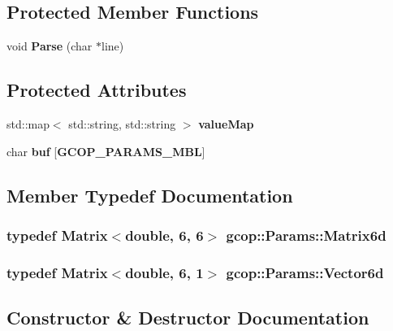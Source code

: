 \subsection*{\-Protected \-Member \-Functions}
\begin{DoxyCompactItemize}
\item 
void {\bf \-Parse} (char $\ast$line)
\end{DoxyCompactItemize}
\subsection*{\-Protected \-Attributes}
\begin{DoxyCompactItemize}
\item 
std\-::map$<$ std\-::string, \*
std\-::string $>$ {\bf value\-Map}
\item 
char {\bf buf} [{\bf \-G\-C\-O\-P\-\_\-\-P\-A\-R\-A\-M\-S\-\_\-\-M\-B\-L}]
\end{DoxyCompactItemize}


\subsection{\-Member \-Typedef \-Documentation}
\subsubsection[{\-Matrix6d}]{\setlength{\rightskip}{0pt plus 5cm}typedef \-Matrix$<$double, 6, 6$>$ {\bf gcop\-::\-Params\-::\-Matrix6d}}\label{classgcop_1_1Params_a8549ff377b97ac6bf3a2510807bad2c7}
\subsubsection[{\-Vector6d}]{\setlength{\rightskip}{0pt plus 5cm}typedef \-Matrix$<$double, 6, 1$>$ {\bf gcop\-::\-Params\-::\-Vector6d}}\label{classgcop_1_1Params_a8be3f08e071e4a6213ad6980ade746ad}


\subsection{\-Constructor \& \-Destructor \-Documentation}
